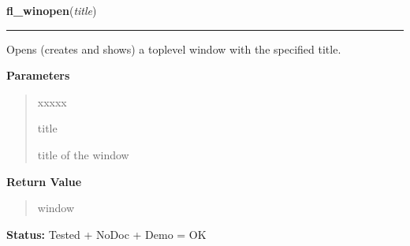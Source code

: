\hspace{.8\funcindent}\begin{boxedminipage}{\funcwidth}

    \raggedright \textbf{fl\_winopen}(\textit{title})

    \vspace{-1.5ex}

    \rule{\textwidth}{0.5\fboxrule}
\setlength{\parskip}{2ex}
    Opens (creates and shows) a toplevel window with the specified title.

\setlength{\parskip}{1ex}
      \textbf{Parameters}
      \vspace{-1ex}

      \begin{quote}
        \begin{Ventry}{xxxxx}

          \item[title]

          title of the window

        \end{Ventry}

      \end{quote}

      \textbf{Return Value}
    \vspace{-1ex}

      \begin{quote}
      window

      \end{quote}

\textbf{Status:} Tested + NoDoc + Demo = OK



    \end{boxedminipage}

    \label{xformslib:library:fl_winhide}

    \vspace{0.5ex}

